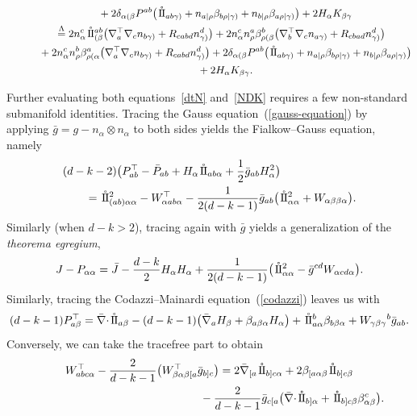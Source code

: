 \documentclass[pdftex]{sigma}
\numberwithin{equation}{section}
\newcommand{\IIo}{\hspace{0.4mm}\mathring{\rm{ I\hspace{-.2mm} I}}{\hspace{.0mm}}}
\renewcommand{\=}{\stackrel \Lambda =}
\newcommand{\csdot}{\hspace{-0.75mm} \cdot \hspace{-0.75mm}}
\begin{document}
\begin{gather}
\qquad\quad{} + 2 \delta_{\alpha (\beta} P^{ab} \bigl(\IIo_{ab \gamma)} + n_{a |\rho} \beta_{b \rho| \gamma)} + n_{b |\rho} \beta_{a \rho| \gamma)}\bigr) + 2 H_{\alpha} K_{\beta \gamma} \nonumber\\
\qquad{}\= 2n^c_{\alpha} \IIo^{ab}_{(\beta} \bigl(\nabla_a^\top \nabla_c n_{b \gamma)} + R_{cabd} n^d_{\gamma)}\bigr) + 2 n^c_{\alpha} n^a_{\rho} \beta^b_{\rho (\beta} \bigl(\nabla_b^\top \nabla_c n_{a \gamma)} + R_{cbad} n^d_{\gamma)} \bigr)\nonumber
\\
\qquad\quad{} + 2 n^c_{\alpha} n^b_{\rho} \beta^a_{\rho (\alpha} \bigl(\nabla^\top_a \nabla_c n_{b \gamma)} + R_{cabd} n^d_{\gamma)}\bigr) + 2 \delta_{\alpha (\beta} P^{ab} \bigl(\IIo_{ab \gamma)} + n_{a |\rho} \beta_{b \rho| \gamma)} + n_{b |\rho} \beta_{a \rho| \gamma)}\bigr) \nonumber\\
\qquad\quad{} + 2 H_{\alpha} K_{\beta \gamma} . \label{NDK}
\end{gather}

Further evaluating both equations~\eqref{dtN} and~\eqref{NDK} requires a few non-standard submanifold identities. Tracing the Gauss equation~(\ref{gauss-equation}) by applying $\bar{g} = g - n_{\alpha} \otimes n_{\alpha}$ to both sides yields the Fialkow--Gauss equation, namely
\begin{align*}
&(d-k-2) \bigl(P^\top_{ab} - \bar{P}_{ab} + H_{\alpha} \IIo_{ab \alpha} + \frac{1}{2} \bar{g}_{ab} H_{\alpha}^2 \bigr) \\
&\qquad{} = \IIo^2_{(ab)\alpha \alpha} - W_{\alpha ab \alpha}^\top - \frac{1}{2(d-k-1)} \bar{g}_{ab} \bigl(\IIo^2_{\alpha \alpha} + W_{\alpha \beta \beta \alpha}\bigr) .
\end{align*}
Similarly (when $d-k > 2$), tracing again with $\bar{g}$ yields a generalization of the \textit{theorema egregium},
\[J - P_{\alpha \alpha} = \bar{J} - \frac{d-k}{2} H_{\alpha} H_{\alpha} + \frac{1}{2(d-k-1)} \bigl(\IIo^2_{\alpha \alpha} - \bar{g}^{cd} W_{\alpha cd \alpha}\bigr) .\]
Similarly, tracing the Codazzi--Mainardi equation~(\ref{codazzi}) leaves us with
\[(d-k-1) P_{a \beta}^\top = \bar{\nabla} \csdot \IIo_{a \beta} - (d-k-1) \bigl(\bar{\nabla}_a H_{\beta} + \beta_{a \beta \alpha} H_{\alpha}\bigr) + \IIo^b_{a \alpha} \beta_{b \beta \alpha} + W_{\gamma \beta \gamma}{}^b \bar{g}_{ab} .\]
Conversely, we can take the tracefree part to obtain
\begin{gather*}
W_{abc \alpha}^\top - \frac{2}{d-k-1} \bigl(W_{\beta \alpha \beta [a}^\top \bar{g}_{b]c}\bigr) = 2 \bar{\nabla}_{[a} \IIo_{b]c \alpha} + 2\beta_{[a \alpha \beta} \IIo_{b]c \beta} \\ \hphantom{W_{abc \alpha}^\top - \frac{2}{d-k-1} \bigl(W_{\beta \alpha \beta [a}^\top \bar{g}_{b]c}\bigr) =}{}
- \frac{2}{d-k-1} \bar{g}_{c [a}\bigl( \bar{\nabla} \csdot \IIo_{b] \alpha} + \IIo_{b]c \beta} \beta^{c}_{\alpha \beta} \bigr).
\end{gather*}
\end{document}
